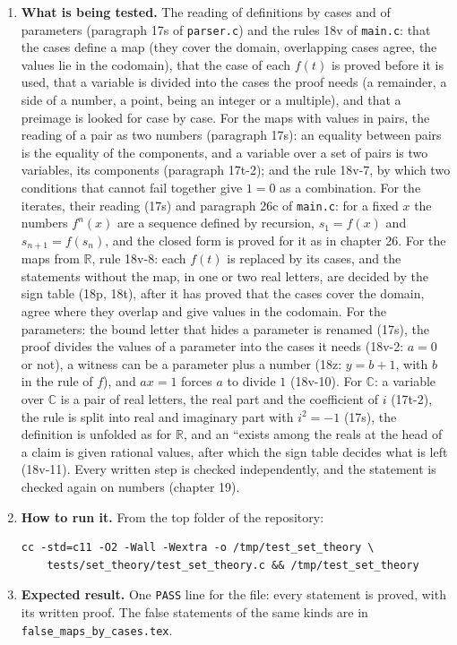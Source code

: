 \documentclass[11pt,a4paper]{article}
\begin{document}
\begin{enumerate}
\item \textbf{What is being tested.} The reading of definitions by cases and of parameters (paragraph 17s of \texttt{parser.c}) and the rules 18v of \texttt{main.c}: that the cases define a map (they cover the domain, overlapping cases agree, the values lie in the codomain), that the case of each $f(t)$ is proved before it is used, that a variable is divided into the cases the proof needs (a remainder, a side of a number, a point, being an integer or a multiple), and that a preimage is looked for case by case. For the maps with values in pairs, the reading of a pair as two numbers (paragraph 17s): an equality between pairs is the equality of the components, and a variable over a set of pairs is two variables, its components (paragraph 17t-2); and the rule 18v-7, by which two conditions that cannot fail together give $1 = 0$ as a combination. For the iterates, their reading (17s) and paragraph 26c of \texttt{main.c}: for a fixed $x$ the numbers $f^{n}(x)$ are a sequence defined by recursion, $s_{1} = f(x)$ and $s_{n + 1} = f(s_{n})$, and the closed form is proved for it as in chapter 26. For the maps from $\mathbb{R}$, rule 18v-8: each $f(t)$ is replaced by its cases, and the statements without the map, in one or two real letters, are decided by the sign table (18p, 18t), after it has proved that the cases cover the domain, agree where they overlap and give values in the codomain. For the parameters: the bound letter that hides a parameter is renamed (17s), the proof divides the values of a parameter into the cases it needs (18v-2: $a = 0$ or not), a witness can be a parameter plus a number (18z: $y = b + 1$, with $b$ in the rule of $f$), and $a x = 1$ forces $a$ to divide $1$ (18v-10). For $\mathbb{C}$: a variable over $\mathbb{C}$ is a pair of real letters, the real part and the coefficient of $i$ (17t-2), the rule is split into real and imaginary part with $i^{2} = -1$ (17s), the definition is unfolded as for $\mathbb{R}$, and an ``exists among the reals at the head of a claim is given rational values, after which the sign table decides what is left (18v-11). Every written step is checked independently, and the statement is checked again on numbers (chapter 19).

\item \textbf{How to run it.} From the top folder of the repository:
\begin{verbatim}
cc -std=c11 -O2 -Wall -Wextra -o /tmp/test_set_theory \
    tests/set_theory/test_set_theory.c && /tmp/test_set_theory
\end{verbatim}

\item \textbf{Expected result.} One \texttt{PASS} line for the file: every statement is proved, with its written proof. The false statements of the same kinds are in \texttt{false\_maps\_by\_cases.tex}.
\end{enumerate}
\end{document}
